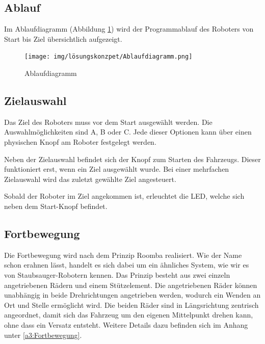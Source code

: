 \documentclass[../main.tex]{subfiles}
\begin{document}
\subsection{Ablauf}

Im Ablaufdiagramm (Abbildung \ref{img:ablaufdiagramm}) wird der Programmablauf des Roboters von Start bis Ziel übersichtlich aufgezeigt.

\begin{figure}[H]
\texttt{[image: img/lösungskonzpet/Ablaufdiagramm.png]}
\caption{Ablaufdiagramm}
\label{img:ablaufdiagramm}
\end{figure}

\newpage
\subsection{Zielauswahl}

Das Ziel des Roboters muss vor dem Start ausgewählt werden. Die Auswahlmöglichkeiten sind A, B oder C. Jede dieser Optionen kann über einen physischen Knopf am Roboter festgelegt werden.

Neben der Zielauswahl befindet sich der Knopf zum Starten des Fahrzeugs. Dieser funktioniert erst, wenn ein Ziel ausgewählt wurde. Bei einer mehrfachen Zielauswahl wird das zuletzt gewählte Ziel angesteuert.

Sobald der Roboter im Ziel angekommen ist, erleuchtet die LED, welche sich neben dem Start-Knopf befindet. 

\subsection{Fortbewegung} 

Die Fortbewegung wird nach dem Prinzip Roomba realisiert. Wie der Name schon erahnen lässt, handelt es sich dabei um ein ähnliches System, wie wir es von Staubsauger-Robotern kennen. Das Prinzip besteht aus zwei einzeln angetriebenen Rädern und einem Stützelement. Die angetriebenen Räder können unabhängig in beide Drehrichtungen angetrieben werden, wodurch ein Wenden an Ort und Stelle ermöglicht wird. Die beiden Räder sind in Längsrichtung zentrisch angeordnet, damit sich das Fahrzeug um den eigenen Mittelpunkt drehen kann, ohne dass ein Versatz entsteht. Weitere Details dazu befinden sich im Anhang unter \ref{a3:Fortbewegung}.
\end{document}
